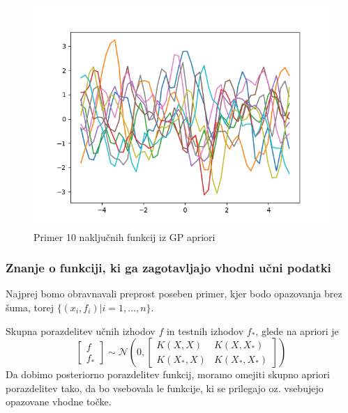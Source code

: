 \documentclass{beamer}
\begin{document}
\begin{frame}

\begin{figure}[h]
\caption{Primer 10 naključnih funkcij iz GP apriori}
\centering
\includegraphics[width=1\textwidth]{10prior}
\end{figure}

\end{frame}

\begin{frame}
\frametitle{Znanje o funkciji, ki ga zagotavljajo vhodni učni podatki}
Najprej bomo obravnavali preprost poseben primer, kjer bodo opazovanja brez šuma, 
torej $ \{ (x_{i}, f_{i}) | i = 1, \ldots , n\}$.

Skupna porazdelitev učnih izhodov $f$ in testnih izhodov $f_{*}$, glede na apriori je
\begin{equation}
\begin{bmatrix}
f\\ 
f_{*}
\end{bmatrix}
\sim \mathcal{N} ( 0, 
\begin{bmatrix}
K(X,X) & K(X,X_{*}) \\ 
K(X_{*},X) & K(X_{*},X_{*})
\end{bmatrix})
\end{equation}
Da dobimo posteriorno porazdelitev funkcij, moramo omejiti skupno apriori porazdelitev tako, 
da bo vsebovala le funkcije, ki se prilegajo oz. vsebujejo opazovane vhodne točke. 

\end{frame}
\end{document}
